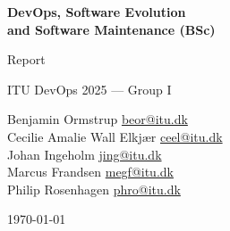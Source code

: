 \documentclass[11pt,a4paper]{article}
\begin{document}
\begin{titlepage}
    \centering
    \vspace*{3cm}
    {\Huge\bfseries DevOps, Software Evolution\\
    and Software Maintenance (BSc)\par}

    \vspace{1cm}

    {\Large Report\par}
    {\Large ITU DevOps 2025 --- Group I\par}
    
    \vspace*{1cm}

    \large
    Benjamin Ormstrup \quad \href{mailto:beor@itu.dk}{beor@itu.dk} \\[0.3cm]
    Cecilie Amalie Wall Elkjær \quad \href{mailto:ceel@itu.dk}{ceel@itu.dk} \\[0.3cm]
    Johan Ingeholm \quad \href{mailto:jing@itu.dk}{jing@itu.dk} \\[0.3cm]
    Marcus Frandsen \quad \href{mailto:megf@itu.dk}{megf@itu.dk} \\[0.3cm]
    Philip Rosenhagen \quad \href{mailto:phro@itu.dk}{phro@itu.dk}

    \vfill

    {\large \today\par}

\end{titlepage}




\tableofcontents
\newpage











\end{document}
